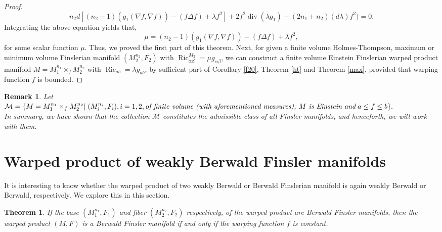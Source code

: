 \documentclass[pdflatex,sn-mathphys-num]{sn-jnl}%
\theoremstyle{thmstyleone}%
\newtheorem{theorem}{Theorem}%
\theoremstyle{thmstyletwo}%
\newtheorem{remark}{Remark}%
\theoremstyle{thmstylethree}%
\begin{document}
\begin{proof}
\begin{equation*}
		n_2	d[(n_2-1)(g_1(\nabla f,\nabla f))-(f \Delta f)+\lambda f^2]+  2f^2\operatorname{div}(\lambda g_1)- ( 2 n_1 + {n_2}) (d\lambda) f^2 ) =0.
		\end{equation*}
 Integrating the above equation yields that,
		\begin{equation}\label{valueofmu}
			\mu=(n_2-1)(g_1(\nabla f,\nabla f))-(f\Delta f)+\lambda f^2,
		\end{equation}
		for some scalar function $\mu$. Thus, we proved the first part of this theorem. Next, for given a finite volume Holmes-Thompson, maximum or minimum volume Finslerian manifold $(M_2^{n_2}, F_2)$ with $\operatorname{Ric}_{\alpha\beta}^{M_2}=\mu g_{\alpha\beta}$,  we can construct a finite volume Einstein Finslerian warped product manifold $M=M_{1}^{n_1}\times_{f}M_{2}^{n_2}$ with $\operatorname{Ric}_{ab}=\lambda g_{ab}$, by sufficient part of Corollary \ref{f20}, Theorem \ref{ht} and Theorem \ref{max}, provided  that warping function $f$ is bounded.
\end{proof}


\vspace{0.15in}

\begin{remark}
    \emph{Let} $\mathcal{M}=\{M=M_1^{n_1}\times_f M_2^{n_2}|\;(M_i^{n_i},F_i),i=1,2,\emph{of finite volume}\\ \emph{ (with aforementioned measures), } M\emph{ is Einstein and\;} a\leq f\leq b \}.$\\
    
    \emph{In summary, we have shown that the collection 
$\mathcal{M}$ constitutes the admissible class of all Finsler manifolds, and henceforth, we will work with them.}
\end{remark}




\section{Warped product of weakly Berwald Finsler manifolds}\label{sec4}

 
It is interesting to know whether the warped product of two 
weakly Berwald or Berwald Finslerian manifold is again
weakly Berwald or Berwald, respectively. We explore this in this section. 

 \vspace{0.15in}
 
	\begin{theorem}\label{Berwald product}
		If the base $(M_1^{n_1},F_1)$ and fiber $(M_2^{n_2},F_2)$
  respectively, of the warped product are Berwald Finsler manifolds, then the warped product $(M,F)$ is a Berwald Finsler manifold if and only if the warping function $f$ is constant.
	\end{theorem}
 
\end{document}

